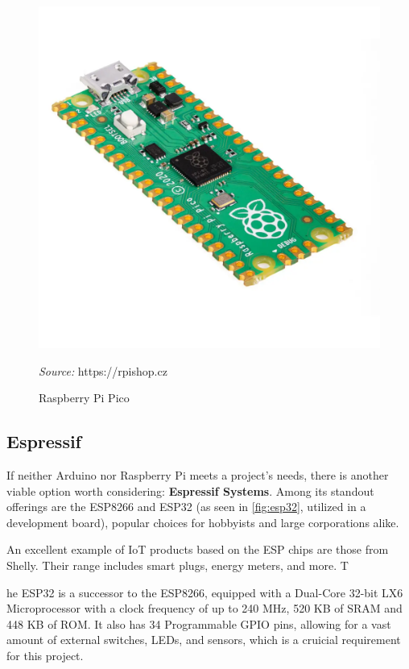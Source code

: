 \documentclass[FM,BP,EN,fonts]{tulthesis}
\begin{document}
\begin{figure}[h]
    \centering
    \includegraphics[scale=.2]{media/rpipicow.png}
    \caption{Raspberry Pi Pico }
    \textit{Source:} https://rpishop.cz
    \label{fig:raspberry}
\end{figure}

\subsection{Espressif}

If neither Arduino nor Raspberry Pi meets a project's needs, there is another viable option worth considering: \textbf{Espressif Systems}. Among its standout offerings are the ESP8266 and ESP32 (as seen in \autoref{fig:esp32}, utilized in a development board), popular choices for hobbyists and large corporations alike. 

An excellent example of IoT products based on the ESP chips are those from Shelly. Their range includes smart plugs, energy meters, and more. T

he ESP32 is a successor to the ESP8266, equipped with a Dual-Core 32-bit LX6 Microprocessor with a clock frequency of up to 240 MHz, 520 KB of SRAM and 448 KB of ROM. It also has 34 Programmable GPIO pins, allowing for a vast amount of external switches, LEDs, and sensors, which is a cruicial requirement for this project.
\end{document}
